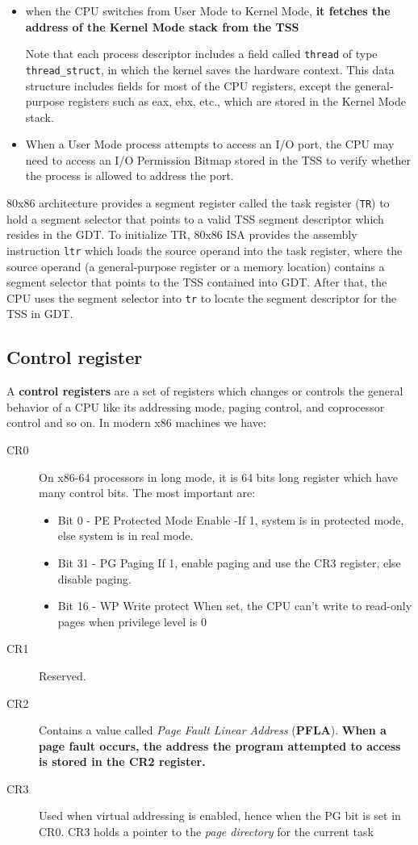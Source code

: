 \documentclass[10pt,a4paper]{article}
\begin{document}
\begin{itemize}
\item when the CPU switches from User Mode to Kernel Mode, \textbf{it fetches the address of the Kernel Mode stack from the TSS} 

Note that each process descriptor includes a field called \texttt{thread} of type \texttt{thread\_struct}, in
which the kernel saves the hardware context. This data structure includes fields for most of the CPU registers, except the general-purpose registers such as eax, ebx, etc., which are stored in the Kernel Mode stack.
\item When a User Mode process attempts to access an I/O port, the CPU may need to access an I/O Permission Bitmap stored in the TSS to verify whether the process is allowed to address the port.
\end{itemize}

80x86 architecture provides a segment register called the task register (\texttt{TR}) to hold a segment selector that points to a valid TSS segment descriptor which resides in the GDT. To initialize TR, 80x86 ISA provides the assembly instruction \texttt{ltr} which loads the source operand into the task register, where the source operand (a general-purpose register or a memory location) contains a segment selector that points to the TSS contained into GDT. After that, the CPU uses the segment selector into \texttt{tr} to locate the segment descriptor for the TSS in GDT.

\subsection{Control register}

A \textbf{control registers} are a set of registers which changes or controls the general behavior of a CPU like its addressing mode, paging control, and coprocessor control and so on. In modern x86 machines we have:
\begin{description}
\item[CR0] On x86-64 processors in long mode, it is 64 bits long register which have many control bits. The most important are:
\begin{itemize}
\item Bit 0 - PE Protected Mode Enable -If 1, system is in protected mode, else system is in real mode.
\item Bit 31 - PG Paging If 1, enable paging and use the CR3 register, else disable paging. 
\item Bit 16 - WP Write protect When set, the CPU can't write to read-only pages when privilege level is 0 
\end{itemize}
\item[CR1] Reserved.
\item[CR2] Contains a value called \textit{Page Fault Linear Address} (\textbf{PFLA}). \textbf{When a page fault occurs, the address the program attempted to access is stored in the CR2 register.}
\item[CR3] Used when virtual addressing is enabled, hence when the PG bit is set in CR0. CR3 holds a pointer to the \textit{page directory} for the current task
\end{description}
\end{document}
